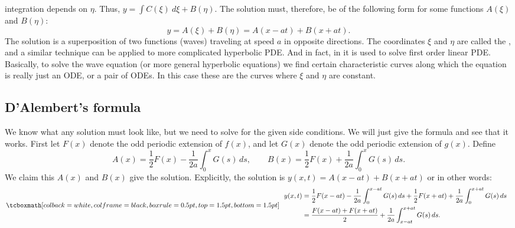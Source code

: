 integration depends on $\eta$.
Thus,
$y = \int C(\xi) ~ d\xi + B(\eta)$.
The solution must, therefore, be of the following form for some functions
$A(\xi)$ and $B(\eta)$:
\begin{equation*}
y = A(\xi) + B(\eta) = A(x-at) + B(x+at) .
\end{equation*}
The solution is a superposition of two functions (waves) traveling at speed
$a$
in opposite directions.  The coordinates $\xi$ and $\eta$ are called the
\emph{}, and a similar technique can
be applied to more complicated hyperbolic PDE\@.
And in fact, in  it is used to solve first
order linear PDE\@.  Basically, to solve the wave equation (or more general
hyperbolic equations) we find certain characteristic curves along which
the equation is really just an ODE\@, or a pair of ODEs.  In this case
these are the curves where $\xi$ and $\eta$ are constant.

\subsection{D'Alembert's formula}

We know what any solution must look like, but we need to solve for the
given side conditions.  We will just give the formula and see that it works.
First let $F(x)$
denote the odd periodic extension of $f(x)$, and let $G(x)$ denote the
odd periodic extension of $g(x)$.  Define
\begin{equation*}
A(x) = \frac{1}{2} F(x) - \frac{1}{2a} \int_0^x G(s) \,ds ,
\qquad
B(x) = \frac{1}{2} F(x) + \frac{1}{2a} \int_0^x G(s) \,ds .
\end{equation*}
We claim this $A(x)$ and $B(x)$ give the solution.  Explicitly, the
solution is $y(x,t) = A(x-at) + B(x+at)$ or in other words:
\begin{equation} \label{dalemb:form}
\mybxbg{~~
\begin{aligned}
y(x,t) & =
\frac{1}{2} F(x-at) - \frac{1}{2a} \int_0^{x-at} G(s) \,ds 
+
\frac{1}{2} F(x+at) + \frac{1}{2a} \int_0^{x+at} G(s) \,ds \\
& =
\frac{F(x-at) + F(x+at)}{2} + \frac{1}{2a} \int_{x-at}^{x+at} G(s) \,ds .
\end{aligned}
~~}
\end{equation}

